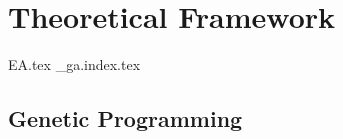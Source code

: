 \chapter{Theoretical Framework}
\label{chap:theoretical_framework}
  {EA.tex}
  {_ga.index.tex}

  \section{Genetic Programming}
  \label{sec:genetic_programming}
    \Blindtext
